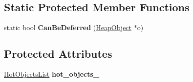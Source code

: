 \subsection*{Static Protected Member Functions}
\begin{DoxyCompactItemize}
\item 
static bool {\bfseries Can\+Be\+Deferred} (\hyperlink{classv8_1_1internal_1_1_heap_object}{Heap\+Object} $\ast$o)\hypertarget{classv8_1_1internal_1_1_serializer_deserializer_a65ec23ada9d043a0063d40b1f9cd37e6}{}\label{classv8_1_1internal_1_1_serializer_deserializer_a65ec23ada9d043a0063d40b1f9cd37e6}

\end{DoxyCompactItemize}
\subsection*{Protected Attributes}
\begin{DoxyCompactItemize}
\item 
\hyperlink{classv8_1_1internal_1_1_hot_objects_list}{Hot\+Objects\+List} {\bfseries hot\+\_\+objects\+\_\+}\hypertarget{classv8_1_1internal_1_1_serializer_deserializer_a0acf7d0187a681e8c2e552b70985537a}{}\label{classv8_1_1internal_1_1_serializer_deserializer_a0acf7d0187a681e8c2e552b70985537a}

\end{DoxyCompactItemize}
